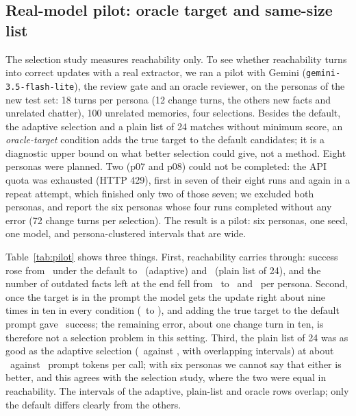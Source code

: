 \IfFileExists{IEEEtran.cls}{\documentclass[journal]{IEEEtran}\def\HAVEIEEE{1}}{\documentclass[10pt,twocolumn]{article}\usepackage[margin=0.7in,columnsep=0.25in]{geometry}}
\begin{document}
\subsection{Real-model pilot: oracle target and same-size list}
\label{sec:pilot}
The selection study measures reachability only. To see whether reachability turns into correct updates with a real extractor, we ran a pilot with Gemini (\texttt{gemini-3.5-flash-lite}), the review gate and an oracle reviewer, on the personas of the new test set: 18 turns per persona (12 change turns, the others new facts and unrelated chatter), 100 unrelated memories, four selections. Besides the default, the adaptive selection and a plain list of 24 matches without minimum score, an \emph{oracle-target} condition adds the true target to the default candidates; it is a diagnostic upper bound on what better selection could give, not a method. Eight personas were planned. Two (p07 and p08) could not be completed: the API quota was exhausted (HTTP 429), first in seven of their eight runs and again in a repeat attempt, which finished only two of those seven; we excluded both personas, and report the six personas whose four runs completed without any error (72 change turns per selection). The result is a pilot: six personas, one seed, one model, and persona-clustered intervals that are wide.

\begin{table}[!t]
\caption{Real-model pilot (6 personas, 72 change turns per row, gate with oracle reviewer). Reach: target in the prompt; right op.\ given reach: correct update among turns where the target was in the prompt; success: correct update accepted; stale: facts still outdated at the end (per persona).}
\label{tab:pilot}
\centering\footnotesize
{}
\end{table}

Table~\ref{tab:pilot} shows three things. First, reachability carries through: success rose from \PilDSucc\ under the default to \PilASucc\ (adaptive) and \PilKSucc\ (plain list of 24), and the number of outdated facts left at the end fell from \PilDStale\ to \PilAStale\ and \PilKStale\ per persona. Second, once the target is in the prompt the model gets the update right about nine times in ten in every condition (\PilOCgr\ to \PilDCgr), and adding the true target to the default prompt gave \PilOSucc\ success; the remaining error, about one change turn in ten, is therefore not a selection problem in this setting. Third, the plain list of 24 was as good as the adaptive selection (\PilKSucc\ against \PilASucc, with overlapping intervals) at about \PilKTok\ against \PilATok\ prompt tokens per call; with six personas we cannot say that either is better, and this agrees with the selection study, where the two were equal in reachability. The intervals of the adaptive, plain-list and oracle rows overlap; only the default differs clearly from the others.
\end{document}
